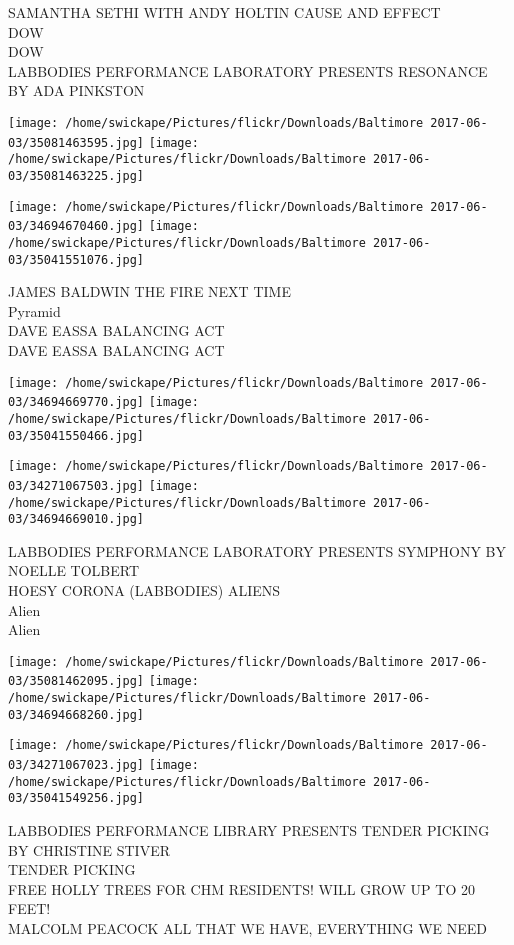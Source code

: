 \documentclass[10pt,letterpaper]{article}
\begin{document}
SAMANTHA SETHI WITH ANDY HOLTIN CAUSE AND EFFECT\\
DOW\\
DOW\\
LABBODIES PERFORMANCE LABORATORY PRESENTS RESONANCE BY ADA PINKSTON\\
\pagebreak

\texttt{[image: /home/swickape/Pictures/flickr/Downloads/Baltimore 2017-06-03/35081463595.jpg]}
\texttt{[image: /home/swickape/Pictures/flickr/Downloads/Baltimore 2017-06-03/35081463225.jpg]}

\texttt{[image: /home/swickape/Pictures/flickr/Downloads/Baltimore 2017-06-03/34694670460.jpg]}
\texttt{[image: /home/swickape/Pictures/flickr/Downloads/Baltimore 2017-06-03/35041551076.jpg]}

JAMES BALDWIN THE FIRE NEXT TIME\\
Pyramid\\
DAVE EASSA BALANCING ACT\\
DAVE EASSA BALANCING ACT\\
\pagebreak

\texttt{[image: /home/swickape/Pictures/flickr/Downloads/Baltimore 2017-06-03/34694669770.jpg]}
\texttt{[image: /home/swickape/Pictures/flickr/Downloads/Baltimore 2017-06-03/35041550466.jpg]}

\texttt{[image: /home/swickape/Pictures/flickr/Downloads/Baltimore 2017-06-03/34271067503.jpg]}
\texttt{[image: /home/swickape/Pictures/flickr/Downloads/Baltimore 2017-06-03/34694669010.jpg]}

LABBODIES PERFORMANCE LABORATORY PRESENTS SYMPHONY BY NOELLE TOLBERT\\
HOESY CORONA (LABBODIES) ALIENS\\
Alien\\
Alien\\
\pagebreak

\texttt{[image: /home/swickape/Pictures/flickr/Downloads/Baltimore 2017-06-03/35081462095.jpg]}
\texttt{[image: /home/swickape/Pictures/flickr/Downloads/Baltimore 2017-06-03/34694668260.jpg]}

\texttt{[image: /home/swickape/Pictures/flickr/Downloads/Baltimore 2017-06-03/34271067023.jpg]}
\texttt{[image: /home/swickape/Pictures/flickr/Downloads/Baltimore 2017-06-03/35041549256.jpg]}

LABBODIES PERFORMANCE LIBRARY PRESENTS TENDER PICKING BY CHRISTINE STIVER\\
TENDER PICKING\\
FREE HOLLY TREES FOR CHM RESIDENTS!  WILL GROW UP TO 20 FEET!\\
MALCOLM PEACOCK ALL THAT WE HAVE, EVERYTHING WE NEED\\
\pagebreak
\end{document}
